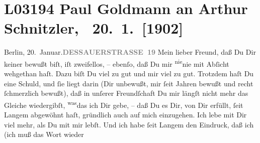 

\section[ Paul Goldmann an Arthur Schnitzler, 20. 1. {[}1902{]}]{L03194 Paul Goldmann an Arthur Schnitzler,  20. 1. {[}1902{]}}
\nopagebreak{}
\rehead{ }\normalsize\beginnumbering{}
\toendnotes[C]{\smallbreak\pagebreak[2]}
\toendnotes[C]{\smallbreak}
\toendnotes[C]{\smallbreak}
\pstart
           {\pb}Berlin, 20. Januar.\hfill \textcolor{gray}{\textbf{DESSAUERSTRASSE 19}}\pend
           \vspace{0.5em}
\pstart
           Mein lieber Freund, daß Du Dir keiner \label{K_L03194-1v}\label{K_L03194-1} bewußt biſt, iſt zweifellos, – ebenſo, daß Du mir \substVorne{}\textsuperscript{nie}\substDazwischen{}nie\substHinten{} mit Abſicht wehgethan haſt. Dazu biſt Du viel zu gut und mir viel zu gut.
                   Trotzdem haſt Du eine Schuld, und{ }ſie liegt darin (Dir unbewußt, mir{ }ſeit
               Jahren bewußt und recht{ }ſchmerzlich bewußt), daß in unſerer Freundſchaft Du mir
               längſt nicht mehr das Gleiche wiedergibſt, \substVorne{}\textsuperscript{was}\substDazwischen{}das\substHinten{} ich Dir gebe, – daß Du  es Dir, von
               Dir erfüllt,{ }ſeit Langem abgewöhnt haſt, \strikeout{\textcolor{gray}{r}} gründlich auch auf mich einzugehen. Ich lebe mit Dir viel mehr, als Du mit mir
               lebſt. Und ich habe{ }ſeit Langem den Eindruck, daß ich (ich muß das Wort wieder
